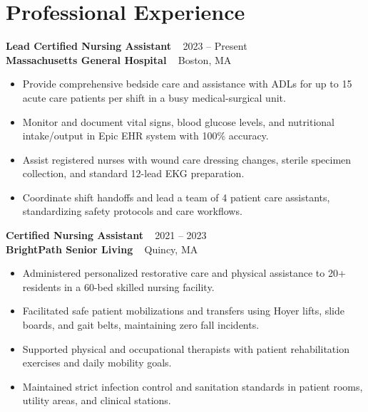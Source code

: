 \documentclass[10pt,letterpaper]{article}
\newcommand{\experienceentry}[4]{
  \noindent\textbf{\color{textdark}#1} \hfill {\color{textmuted}\small\faCalendar* ~ #2} \\
  {\color{accent}\small\textbf{#3}} \hfill {\color{textmuted}\small\faMapMarker* ~ #4}
  \vspace{1.5mm}
}
\begin{document}
\begin{minipage}[t]{0.61\linewidth}
  \section{Professional Experience}
  
  \experienceentry{Lead Certified Nursing Assistant}{2023 -- Present}{Massachusetts General Hospital}{Boston, MA}
  \begin{itemize}
    \item Provide comprehensive bedside care and assistance with ADLs for up to 15 acute care patients per shift in a busy medical-surgical unit.
    \item Monitor and document vital signs, blood glucose levels, and nutritional intake/output in Epic EHR system with 100\% accuracy.
    \item Assist registered nurses with wound care dressing changes, sterile specimen collection, and standard 12-lead EKG preparation.
    \item Coordinate shift handoffs and lead a team of 4 patient care assistants, standardizing safety protocols and care workflows.
  \end{itemize}
  
  \vspace{4mm}
  
  \experienceentry{Certified Nursing Assistant}{2021 -- 2023}{BrightPath Senior Living}{Quincy, MA}
  \begin{itemize}
    \item Administered personalized restorative care and physical assistance to 20+ residents in a 60-bed skilled nursing facility.
    \item Facilitated safe patient mobilizations and transfers using Hoyer lifts, slide boards, and gait belts, maintaining zero fall incidents.
    \item Supported physical and occupational therapists with patient rehabilitation exercises and daily mobility goals.
    \item Maintained strict infection control and sanitation standards in patient rooms, utility areas, and clinical stations.
  \end{itemize}
\end{minipage}
\hfill
\end{document}

